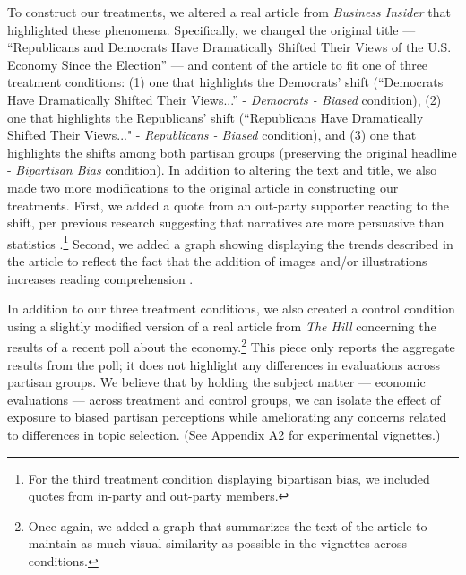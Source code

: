 \documentclass[12pt, letterpaper]{article}
\begin{document}
{To construct our treatments, we altered a real article from \textit{Business Insider} that highlighted these phenomena. Specifically, we changed the original title --- ``Republicans and Democrats Have Dramatically Shifted Their Views of the U.S. Economy Since the Election'' \citep{bi_2016} --- and content of the article to fit one of three treatment conditions: (1) one that highlights the Democrats' shift (``Democrats Have Dramatically Shifted Their Views...'' - \textit{Democrats - Biased} condition), (2) one that highlights the Republicans' shift (``Republicans Have Dramatically Shifted Their Views..." - \textit{Republicans - Biased} condition), and (3) one that highlights the shifts among both partisan groups (preserving the original headline - \textit{Bipartisan Bias} condition). In addition to altering the text and title, we also made two more modifications to the original article in constructing our treatments. First, we added a quote from an out-party supporter reacting to the shift, per previous research suggesting that narratives are more persuasive than statistics \citep{Kahneman2011}.\footnote{For the third treatment condition displaying bipartisan bias, we included quotes from in-party and out-party members.} Second, we added a graph showing displaying the trends described in the article to reflect the fact that the addition of images and/or illustrations increases reading comprehension \citep{gambrelljawitz_1993}. 

In addition to our three treatment conditions, we also created a control condition using a slightly modified version of a real article from \textit{The Hill} concerning the results of a recent poll about the economy.\footnote{Once again, we added a graph that summarizes the text of the article to maintain as much visual similarity as possible in the vignettes across conditions.} This piece only reports the aggregate results from the poll; it does not highlight any differences in evaluations across partisan groups. We believe that by holding the subject matter --- economic evaluations --- across treatment and control groups, we can isolate the effect of exposure to biased partisan perceptions while ameliorating any concerns related to differences in topic selection. (See Appendix A2 for experimental vignettes.) 

}
\end{document}
